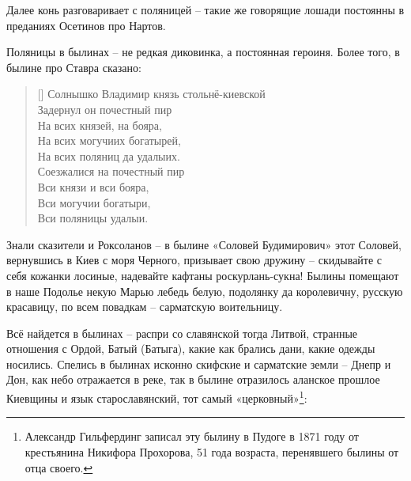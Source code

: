 Далее конь разговаривает с поляницей – такие же говорящие лошади постоянны в преданиях Осетинов про Нартов.

Поляницы в былинах – не редкая диковинка, а постоянная героиня. Более того, в былине про Ставра сказано:

\settowidth{\versewidth}{Солнышко Владимир князь стольнё-киевской} 
\begin{verse}[\versewidth]
Солнышко Владимир князь стольнё-киевской\\
Задернул он почестный пир\\
На всих князей, на бояра,\\
На всих могучиих богатырей,\\
На всих поляниц да удалыих.\\
Соезжалися на почестный пир\\
Вси князи и вси бояра,\\
Вси могучии богатыри,\\
Вси поляницы удалыи.
\end{verse}

Знали сказители и Роксоланов – в былине «Соловей Будимирович» этот Соловей, вернувшись в Киев с моря Черного, призывает свою дружину – скидывайте с себя кожанки лосиные, надевайте кафтаны роскурлань-сукна! Былины помещают в наше Подолье некую Марью лебедь белую, подолянку да королевичну, русскую красавицу, по всем повадкам – сарматскую воительницу.

Всё найдется в былинах – распри со славянской тогда Литвой, странные отношения с Ордой, Батый (Батыга), какие как брались дани, какие одежды носились. Спелись в былинах исконно скифские и сарматские земли – Днепр и Дон, как небо отражается в реке, так в былине отразилось аланское прошлое Киевщины и язык старославянский, тот самый «церковный»\footnote{Александр Гильфердинг записал эту былину в Пудоге в 1871 году от крестьянина Никифора Прохорова, 51 года возраста, перенявшего былины от отца своего.}:


